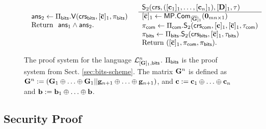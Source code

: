 \begin{figure}[H]
\begin{\algSize}
$$\begin{array}{ll}
\begin{array}{l}
\mathsf{ans}_2 \gets \Pi_{\mathsf{bits}}.\mathsf{V}(\mathsf{crs}_{\mathsf{bits}},[\overline{\mathbf{c}}]_1,\pi_{\mathsf{bits}})\\
\text{Return } \ \mathsf{ans}_1\wedge\mathsf{ans}_2.
\\
\\
\end{array}
&
\begin{array}{l}
{\mathsf{S}_2(\mathsf{crs},([\mathbf{c}_1]_1,\ldots,[\mathbf{c}_n]_1),[\mathbf{{D}}]_1,\tau)}\\
\hline
{[\overline{\mathbf{c}}]_1 \gets \mathsf{MP}.\mathsf{Com}_{[\overline{\mathbf{{G}}}]_1}(\mathbf{0}_{mn\times 1})}\\
\pi_{\mathsf{com}}\gets \Pi_{\mathsf{com}}.\mathsf{S}_2(\mathsf{crs}_{\mathsf{com}},[\mathbf{c}]_1,[\overline{\mathbf{c}}]_1,\tau_{\mathsf{com}})\\
\pi_{\mathsf{bits}} \gets \Pi_{\mathsf{bits}}.\mathsf{S}_2(\mathsf{crs}_{\mathsf{bits}},[\overline{\mathbf{c}}]_1,\tau_{\mathsf{bits}})\\
\text{Return }  ([\overline{\mathbf{c}}]_1,\pi_{\mathsf{com}}, \pi_{\mathsf{bits}}).
\end{array}
\end{array}$$
\end{\algSize}
\caption{The proof system for the language $\mathcal{L}_{[\mathbf{{G}}]_1,\mathsf{bits}}^n$. $\Pi_{\mathsf{bits}}$ is the proof system from Sect. \ref{sec:bits-scheme}. The matrix $\mathbf{{G}}^n$ is defined as
$\mathbf{{G}}^n:=(\mathbf{{G}}_1\oplus\ldots\oplus\mathbf{{G}}_1||\mathbf{g}_{n+1}\oplus\ldots\oplus\mathbf{g}_{n+1})$, and $\mathbf{c}:=\mathbf{c}_1\oplus\ldots\oplus\mathbf{c}_n$ and $\mathbf{b}:=\mathbf{b}_1\oplus\ldots\oplus\mathbf{b}$.
\label{fig:bitsn}
}
\end{figure}
\subsection{Security Proof}

